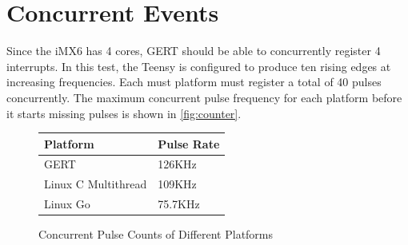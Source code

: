 \section{Concurrent Events}\label{sec:concurrency}
Since the iMX6 has 4 cores, GERT should be able to concurrently
register 4 interrupts. In this test, the Teensy is configured to produce
ten rising edges at increasing frequencies. Each must platform must
register a total of 40 pulses concurrently. The maximum concurrent
pulse frequency for each platform before it starts missing pulses is shown in \ref{fig:counter}.




\begin{figure} [h]
\begin{center}
  \begin{tabular}{ | l | l |}
    \hline
    Platform & Pulse Rate \\ \hline
    GERT & 126KHz \\ \hline
    Linux C Multithread & 109KHz \\ \hline
    Linux Go & 75.7KHz \\
    \hline
  \end{tabular}
\end{center}
  \caption{Concurrent Pulse Counts of Different Platforms}  \label{fig:ccounter}
\end{figure}

